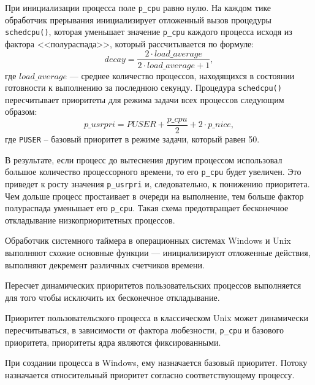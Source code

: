 При инициализации процесса поле \texttt{p\_cpu} равно нулю. На каждом тике обработчик прерывания инициализирует отложенный вы­зов процедуры \texttt{schedcpu()}, которая уменьшает значение \texttt{p\_cpu} каждого процесса
исходя из фактора <<полураспада>>, который рассчитывается по формуле:
\begin{equation}
	decay = \frac{2 \cdot load\_average}{2 \cdot load\_average + 1},
\end{equation}
где $load\_average$ --- среднее количество процессов, находящихся в состоянии готовности к выполнению за последнюю секунду. 
Процедура \texttt{schedcpu()} пересчитывает приоритеты для режима задачи всех процессов следующим образом:
\begin{equation}
	p\_usrpri = PUSER + \frac{p\_cpu}{2} + 2 \cdot p\_nice,
\end{equation}
где \texttt{PUSER} -- базовый приоритет в режиме задачи, который равен 50.

В результате, если процесс до вытеснения другим процессом использовал большое количество процессорного времени, то его \texttt{p\_cpu} будет увеличен. Это приведет к росту значения \texttt{p\_usrpri} и, следовательно, к понижению приоритета. Чем дольше процесс простаивает в очереди на выполнение, тем больше фактор полураспада уменьшает его \texttt{p\_cpu}. Такая схема предотвращает бесконечное откладывание низкоприоритетных процессов. 


Обработчик системного таймера в операционных системах Windows и Unix выполняют схожие основные функции --- инициализируют отложенные действия, выполняют декремент различных счетчиков времени.

Пересчет динамических приоритетов пользовательских процессов выполняется для того чтобы исключить их бесконечное откладывание.

Приоритет пользовательского процесса в классическом Unix может динамически пересчитываться, в зависимости от фактора любезности, \texttt{p\_cpu} и базового приоритета, приоритеты ядра являются фиксированными. 

При создании процесса в Windows, ему назначается базовый приоритет. Потоку назначается относительный приоритет согласно соответствующему процессу.
